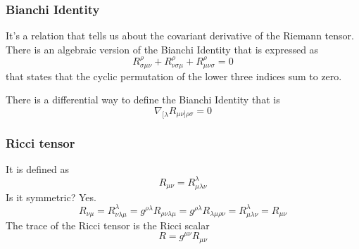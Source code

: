 \subsubsection{Bianchi Identity}
It's a relation that tells us about the covariant derivative of the Riemann tensor.
There is an algebraic version of the Bianchi Identity that is expressed as
\begin{equation}
R^{\rho }_{\sigma \mu \nu } + R^{\rho }_{\nu \sigma \mu } + R^{\rho }_{\mu \nu \sigma } = 0
\end{equation}
that states that the cyclic permutation of the lower three indices sum to zero.\par
There is a differential way to define the Bianchi Identity that is
\begin{equation}
	\nabla_{[\lambda }R_{\mu \nu ]\rho \sigma } = 0		
\end{equation}

\subsubsection{Ricci tensor}
It is defined as
\begin{equation}
R_{\mu \nu } = R^{\lambda }_{\mu \lambda \nu }
\end{equation}
Is it symmetric? Yes.
\[
R_{\nu \mu } = R^{\lambda }_{ \nu \lambda \mu } = g^{\rho \lambda }R_{\rho \nu \lambda \mu } = g^{\rho \lambda }R_{\lambda \mu \rho \nu } = R^{\lambda }_{\mu \lambda \nu } = R_{\mu \nu }
\]
The trace of the Ricci tensor is the Ricci scalar
\begin{equation}
R = g^{\mu \nu }R_{\mu \nu }
\end{equation}


